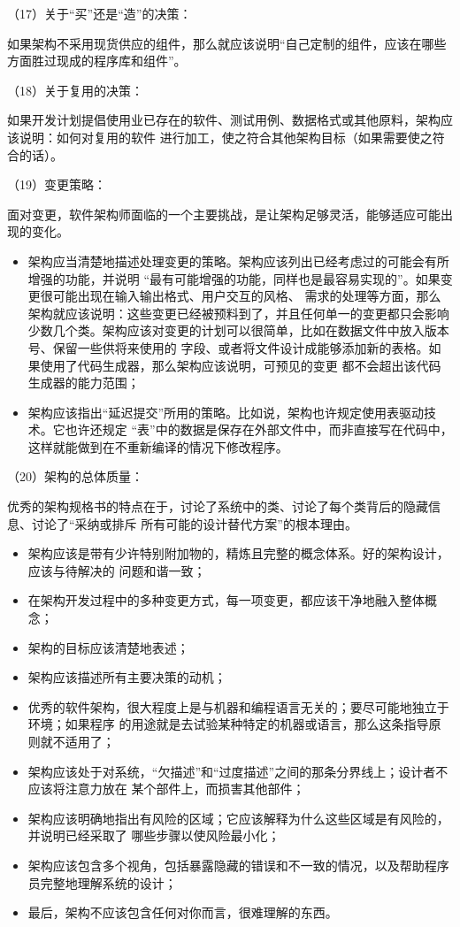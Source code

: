 \documentclass{article}
\begin{document}
\par
（17）关于“买”还是“造”的决策：
\par
如果架构不采用现货供应的组件，那么就应该说明“自己定制的组件，应该在哪些方面胜过现成的程序库和组件”。

\par
（18）关于复用的决策：
\par
如果开发计划提倡使用业已存在的软件、测试用例、数据格式或其他原料，架构应该说明：如何对复用的软件
进行加工，使之符合其他架构目标（如果需要使之符合的话）。

\par
（19）变更策略：
\par
面对变更，软件架构师面临的一个主要挑战，是让架构足够灵活，能够适应可能出现的变化。
\begin{itemize}
    \item 架构应当清楚地描述处理变更的策略。架构应该列出已经考虑过的可能会有所增强的功能，并说明
    “最有可能增强的功能，同样也是最容易实现的”。如果变更很可能出现在输入输出格式、用户交互的风格、
    需求的处理等方面，那么架构就应该说明：这些变更已经被预料到了，并且任何单一的变更都只会影响
    少数几个类。架构应该对变更的计划可以很简单，比如在数据文件中放入版本号、保留一些供将来使用的
    字段、或者将文件设计成能够添加新的表格。如果使用了代码生成器，那么架构应该说明，可预见的变更
    都不会超出该代码生成器的能力范围；
    \item 架构应该指出“延迟提交”所用的策略。比如说，架构也许规定使用表驱动技术。它也许还规定
    “表”中的数据是保存在外部文件中，而非直接写在代码中，这样就能做到在不重新编译的情况下修改程序。
\end{itemize}

\par
（20）架构的总体质量：
\par
优秀的架构规格书的特点在于，讨论了系统中的类、讨论了每个类背后的隐藏信息、讨论了“采纳或排斥
所有可能的设计替代方案”的根本理由。
\begin{itemize}
    \item 架构应该是带有少许特别附加物的，精炼且完整的概念体系。好的架构设计，应该与待解决的
    问题和谐一致；
    \item 在架构开发过程中的多种变更方式，每一项变更，都应该干净地融入整体概念；
    \item 架构的目标应该清楚地表述；
    \item 架构应该描述所有主要决策的动机；
    \item 优秀的软件架构，很大程度上是与机器和编程语言无关的；要尽可能地独立于环境；如果程序
    的用途就是去试验某种特定的机器或语言，那么这条指导原则就不适用了；
    \item 架构应该处于对系统，“欠描述”和“过度描述”之间的那条分界线上；设计者不应该将注意力放在
    某个部件上，而损害其他部件；
    \item 架构应该明确地指出有风险的区域；它应该解释为什么这些区域是有风险的，并说明已经采取了
    哪些步骤以使风险最小化；
    \item 架构应该包含多个视角，包括暴露隐藏的错误和不一致的情况，以及帮助程序员完整地理解系统的设计；
    \item 最后，架构不应该包含任何对你而言，很难理解的东西。
\end{itemize}
\end{document}
